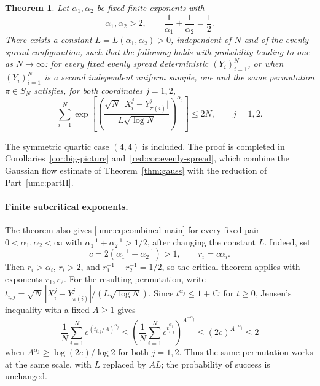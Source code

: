 \documentclass[11pt]{article}
\newtheorem{theorem}{Theorem}[section]
\theoremstyle{definition}
\theoremstyle{remark}
\numberwithin{equation}{section}
\begin{document}
\begin{theorem}\label{umc:thm:main}
Let $\alpha_1,\alpha_2$ be fixed finite exponents with
\[
  \alpha_1,\alpha_2>2,
  \qquad \frac{1}{\alpha_1}+\frac{1}{\alpha_2}=\frac12.
\]
There exists a constant $L=L(\alpha_1,\alpha_2)>0$, independent
of $N$ and of the evenly spread configuration, such that the following
holds with probability tending to one as $N\to\infty$: for
\emph{every fixed evenly spread deterministic} $(Y_i)_{i=1}^N$, or
when $(Y_i)_{i=1}^N$ is a second independent uniform sample,
\emph{one and the same} permutation $\pi\in S_N$ satisfies, for both
coordinates $j=1,2$,
\begin{equation}\label{umc:eq:combined-main}
  \sum_{i=1}^N
  \exp\!\left[
    \left(
      \frac{\sqrt N\,\bigl|X_i^j-Y_{\pi(i)}^j\bigr|}
           {L\sqrt{\log N}}
    \right)^{\alpha_j}
  \right]
  \le 2N,\qquad j=1,2.
\end{equation}
\end{theorem}

The symmetric quartic case $(4,4)$ is included. The proof is completed
in Corollaries~\ref{cor:big-picture} and~\ref{red:cor:evenly-spread},
which combine the Gaussian flow estimate of
Theorem~\ref{thm:gauss} with the reduction of
Part~\ref{umc:partII}.

\paragraph{Finite subcritical exponents.}
The theorem also gives \eqref{umc:eq:combined-main} for every fixed
pair $0<\alpha_1,\alpha_2<\infty$ with
$\alpha_1^{-1}+\alpha_2^{-1}>1/2$, after changing the constant $L$.
Indeed, set
\[
 c=2(\alpha_1^{-1}+\alpha_2^{-1})>1,\qquad r_i=c\alpha_i.
\]
Then $r_i>\alpha_i$, $r_i>2$, and $r_1^{-1}+r_2^{-1}=1/2$,
so the critical theorem applies with exponents $r_1,r_2$.
For the resulting permutation, write
$t_{i,j}=\sqrt N\,|X_i^j-Y_{\pi(i)}^j|/(L\sqrt{\log N})$.
Since $t^{\alpha_j}\le1+t^{r_j}$ for $t\ge0$, Jensen's inequality
with a fixed $A\ge1$ gives
\[
 \frac1N\sum_{i=1}^N e^{(t_{i,j}/A)^{\alpha_j}}
 \le\left(\frac1N\sum_{i=1}^N e^{t_{i,j}^{\alpha_j}}\right)^{A^{-\alpha_j}}
 \le(2e)^{A^{-\alpha_j}}\le2
\]
when $A^{\alpha_j}\ge\log(2e)/\log2$ for both $j=1,2$.
Thus the same permutation works at the same scale, with $L$
replaced by $AL$; the probability of success is unchanged.
\end{document}
